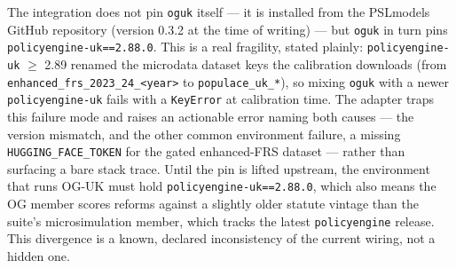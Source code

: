 The integration does not pin \texttt{oguk} itself --- it is installed from the PSLmodels GitHub repository (version 0.3.2 at the time of writing) --- but \texttt{oguk} in turn pins \texttt{policyengine-uk==2.88.0}. This is a real fragility, stated plainly: \texttt{policyengine-uk} $\geq$ 2.89 renamed the microdata dataset keys the calibration downloads (from \texttt{enhanced\_frs\_2023\_24\_<year>} to \texttt{populace\_uk\_*}), so mixing \texttt{oguk} with a newer \texttt{policyengine-uk} fails with a \texttt{KeyError} at calibration time. The adapter traps this failure mode and raises an actionable error naming both causes --- the version mismatch, and the other common environment failure, a missing \texttt{HUGGING\_FACE\_TOKEN} for the gated enhanced-FRS dataset --- rather than surfacing a bare stack trace. Until the pin is lifted upstream, the environment that runs OG-UK must hold \texttt{policyengine-uk==2.88.0}, which also means the OG member scores reforms against a slightly older statute vintage than the suite's microsimulation member, which tracks the latest \texttt{policyengine} release. This divergence is a known, declared inconsistency of the current wiring, not a hidden one.
